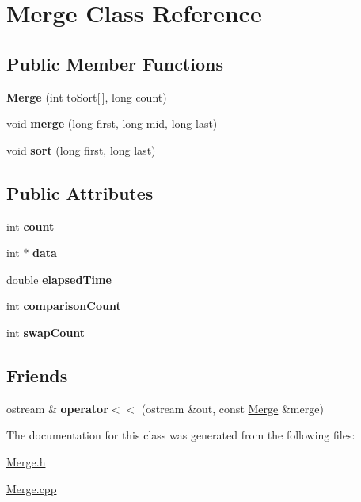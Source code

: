 \hypertarget{class_merge}{}\section{Merge Class Reference}
\label{class_merge}
\subsection*{Public Member Functions}
\begin{DoxyCompactItemize}
\item 
\hypertarget{class_merge_aac58a36e74e244ab4b443f0ade1d16a8}{}\label{class_merge_aac58a36e74e244ab4b443f0ade1d16a8} 
{\bfseries Merge} (int to\+Sort\mbox{[}$\,$\mbox{]}, long count)
\item 
\hypertarget{class_merge_a3cd9fb221e78c332d439883e53d23440}{}\label{class_merge_a3cd9fb221e78c332d439883e53d23440} 
void {\bfseries merge} (long first, long mid, long last)
\item 
\hypertarget{class_merge_a6b3314073653c858f76d7f4adc8b9f45}{}\label{class_merge_a6b3314073653c858f76d7f4adc8b9f45} 
void {\bfseries sort} (long first, long last)
\end{DoxyCompactItemize}
\subsection*{Public Attributes}
\begin{DoxyCompactItemize}
\item 
\hypertarget{class_merge_a395a0dd6b54b09faf35168666e3f2c94}{}\label{class_merge_a395a0dd6b54b09faf35168666e3f2c94} 
int {\bfseries count}
\item 
\hypertarget{class_merge_a3b5468a4c2ecb439b3421729d09d345a}{}\label{class_merge_a3b5468a4c2ecb439b3421729d09d345a} 
int $\ast$ {\bfseries data}
\item 
\hypertarget{class_merge_a204fde840bb54d34b3c88fbfd7dd158a}{}\label{class_merge_a204fde840bb54d34b3c88fbfd7dd158a} 
double {\bfseries elapsed\+Time}
\item 
\hypertarget{class_merge_a7a1b2086b2d63829ca4e12b6e6ef7dea}{}\label{class_merge_a7a1b2086b2d63829ca4e12b6e6ef7dea} 
int {\bfseries comparison\+Count}
\item 
\hypertarget{class_merge_a6da814d2d2eac538dbae8058ee6f3e78}{}\label{class_merge_a6da814d2d2eac538dbae8058ee6f3e78} 
int {\bfseries swap\+Count}
\end{DoxyCompactItemize}
\subsection*{Friends}
\begin{DoxyCompactItemize}
\item 
\hypertarget{class_merge_ab7cb5f5c927b42e50b482ff57fcbdb89}{}\label{class_merge_ab7cb5f5c927b42e50b482ff57fcbdb89} 
ostream \& {\bfseries operator$<$$<$} (ostream \&out, const \hyperlink{class_merge}{Merge} \&merge)
\end{DoxyCompactItemize}


The documentation for this class was generated from the following files\+:\begin{DoxyCompactItemize}
\item 
\hyperlink{_merge_8h}{Merge.\+h}\item 
\hyperlink{_merge_8cpp}{Merge.\+cpp}\end{DoxyCompactItemize}
